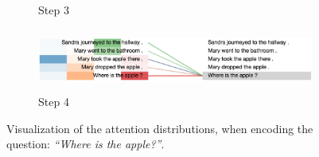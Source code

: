 \begin{figure}[!h]
\begin{minipage}{\textwidth}
\begin{subfigure}[t]{\textwidth}
        \caption{Step 3}
    \end{subfigure}
    \hfill \hfill 
    \begin{subfigure}[t]{\textwidth}
        \centering
        \includegraphics[height=0.8in]{04-part-03/chapter-06/figs_and_tables/figs_attention_babi/e2-step4}
        \caption{Step 4}
    \end{subfigure}
    \end{minipage}
    \caption{\label{fig:ex2}Visualization of the attention distributions, when encoding the question: \emph{``Where is the apple?''}.}
\end{figure}

\afterpage{\clearpage}


